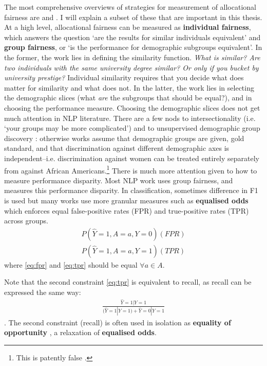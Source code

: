 The most comprehensive overviews of strategies for measurement of allocational fairness are \citet{hutchinson_mitchell_2019} and \citet{barocas-hardt-narayanan}. I will explain a subset of these that are important in this thesis. At a high level, allocational fairness can be measured as \textbf{individual fairness}, which answers the question `are the results for similar individuals equivalent' and \textbf{group fairness}, or `is the performance for demographic subgroups equivalent'. In the former, the work lies in defining the similarity function. \textit{What is similar? Are two individuals with the same university degree similar? Or only if you bucket by university prestige?} Individual similarity requires that you decide what does matter for similarity and what does not. In the latter, the work lies in selecting the demographic slices (what \textit{are} the subgroups that should be equal?), and in choosing the performance measure. Choosing the demographic slices does not get much attention in NLP literature. There are a few nods to intersectionality \citep{} (i.e. `your groups may be more complicated') and to unsupervised demographic group discovery \citep{zhao-chang-2020-logan}: otherwise works assume that demographic groups are given, gold standard, and that discrimination against different demographic axes is independent--i.e. discrimination against women can be treated entirely separately from against African Americans.\footnote{This is patently false \citep{some intersectionality thing}.}  There is much more attention given to how to measure performance disparity.
Most NLP work uses group fairness, and measures this performance disparity.  In classification, sometimes difference in F1 is used \citep{zhao-etal-2018-gender} but many works use more granular measures such as \textbf{equalised odds} \citep{hardt2016equality} which enforces equal false-positive rates (FPR) and true-positive rates (TPR) across groups.
\begin{align}\label{eq:fpr}
    P(\hat{Y} = 1, A=a, Y=0) (FPR)
\end{align}
\begin{align}\label{eq:tpr}
    P(\hat{Y} = 1, A=a, Y=1) (TPR)
\end{align}
where \ref{eq:fpr} and \ref{eq:tpr} should be equal $\forall a \in A$.

Note that the second constraint \ref{eq:tpr} is equivalent to recall, as recall can be expressed the same way:
\begin{align}\label{eq:recall}
    \frac{\hat{Y} = 1 | Y=1}{(\hat{Y} = 1 | Y=1) + \hat{Y} = 0 | Y=1}
\end{align}.
The second constraint (recall) is often used in isolation as \textbf{equality of opportunity} \citep{hardt2016equality}, a relaxation of \textbf{equalised odds}. 

